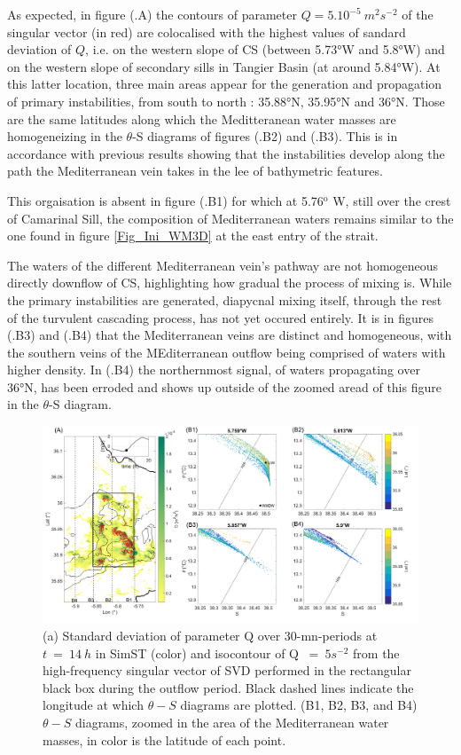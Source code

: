 As expected, in figure (.A) the contours of parameter $Q= 5.10^{-5}\ m^2s^{-2}$ of the singular vector (in red) are colocalised with the highest values of sandard deviation of $Q$, i.e. on the western slope of CS (between 5.73°W and 5.8°W) and on the western slope of secondary sills in Tangier Basin (at around 5.84°W). At this latter location, three main areas appear for the generation and propagation of primary instabilities, from south to north : 35.88°N, 35.95°N and 36°N. Those are the same latitudes along which the Meditteranean water masses are homogeneizing in the $\theta$-S diagrams of figures (.B2) and (.B3). This is in accordance with previous results showing that the instabilities develop along the path the Mediterranean vein takes in the lee of bathymetric features. 

This orgaisation is absent in figure (.B1) for which at 5.76$^{\text{o}}$ W, still over the crest of Camarinal Sill, the composition of Mediterranean waters remains similar to the one found in figure \ref{Fig_Ini_WM3D} at the east entry of the strait.

The waters of the different Mediterranean vein's pathway are not homogeneous directly downflow of CS, highlighting how gradual the process of mixing is. While the primary instabilities are generated, diapycnal mixing itself, through the rest of the turvulent cascading process, has not yet occured entirely. It is in figures (.B3) and (.B4) that the Mediterranean veins are distinct and homogeneous, with the southern veins of the MEditerranean outflow being comprised of waters with higher density. In (.B4) the northernmost signal, of waters propagating  over 36°N, has been erroded and shows up outside of the zoomed aread of this figure in the $\theta$-S diagram. 

\begin{figure}[!h]
 \includegraphics[width=\textwidth]{./GBR3D/TS_coupes_14H_VE2o.png}
 \caption {(a) Standard deviation of parameter Q over 30-mn-periods at $t\ =\ 14\ h$ in SimST (color) and isocontour of Q $\ =\ 5 s^{-2}$ from the high-frequency singular vector of SVD performed in the rectangular black box during the outflow period. Black dashed lines indicate the longitude at which $\theta-S$ diagrams are plotted. (B1, B2, B3, and B4) $\theta-S$ diagrams, zoomed in the area of the Mediterranean water masses, in color is the latitude of each point.}
 \label{FigTSCS}
\end{figure}

